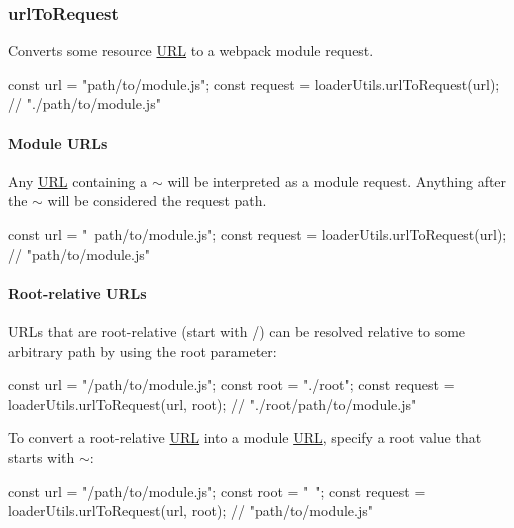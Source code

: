 \subsubsection*{{\ttfamily url\+To\+Request}}

Converts some resource \mbox{\hyperlink{namespace_u_r_l}{U\+RL}} to a webpack module request.


\begin{DoxyCode}
const url = "path/to/module.js";
const request = loaderUtils.urlToRequest(url); // "./path/to/module.js"
\end{DoxyCode}


\paragraph*{Module U\+R\+Ls}

Any \mbox{\hyperlink{namespace_u_r_l}{U\+RL}} containing a {\ttfamily $\sim$} will be interpreted as a module request. Anything after the {\ttfamily $\sim$} will be considered the request path.


\begin{DoxyCode}
const url = "~path/to/module.js";
const request = loaderUtils.urlToRequest(url); // "path/to/module.js"
\end{DoxyCode}


\paragraph*{Root-\/relative U\+R\+Ls}

U\+R\+Ls that are root-\/relative (start with {\ttfamily /}) can be resolved relative to some arbitrary path by using the {\ttfamily root} parameter\+:


\begin{DoxyCode}
const url = "/path/to/module.js";
const root = "./root";
const request = loaderUtils.urlToRequest(url, root); // "./root/path/to/module.js"
\end{DoxyCode}


To convert a root-\/relative \mbox{\hyperlink{namespace_u_r_l}{U\+RL}} into a module \mbox{\hyperlink{namespace_u_r_l}{U\+RL}}, specify a {\ttfamily root} value that starts with {\ttfamily $\sim$}\+:


\begin{DoxyCode}
const url = "/path/to/module.js";
const root = "~";
const request = loaderUtils.urlToRequest(url, root); // "path/to/module.js"
\end{DoxyCode}


